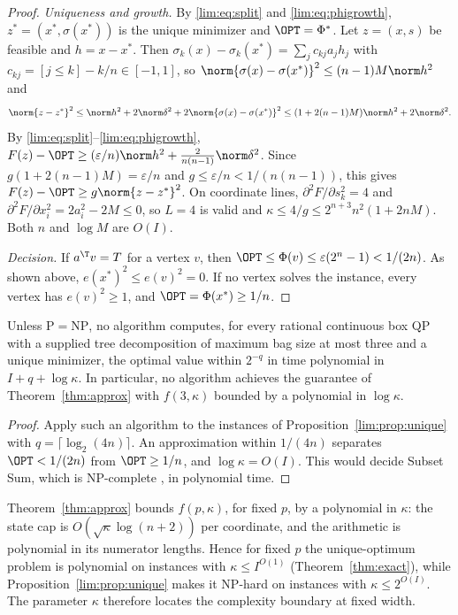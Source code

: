 \begin{proof}
\emph{Uniqueness and growth.} By \eqref{lim:eq:split} and
\eqref{lim:eq:phigrowth}, $z^*=(x^*,\sigma(x^*))$ is the unique minimizer
and $\OPT=\Phi^*$. Let $z=(x,s)$ be feasible and $h=x-x^*$. Then
$\sigma_k(x)-\sigma_k(x^*)=\sum_jc_{kj}a_jh_j$ with
$c_{kj}=[j\le k]-k/n\in[-1,1]$, so
$\norm{\sigma(x)-\sigma(x^*)}^2\le(n-1)M\norm h^2$ and
\[
\norm{z-z^*}^2\le\norm h^2+2\norm\delta^2+2\norm{\sigma(x)-\sigma(x^*)}^2
\le(1+2(n-1)M)\norm h^2+2\norm\delta^2 .
\]
By \eqref{lim:eq:split}--\eqref{lim:eq:phigrowth},
$F(z)-\OPT\ge(\varepsilon/n)\norm h^2+\frac2{n(n-1)}\norm\delta^2$. Since
$g(1+2(n-1)M)=\varepsilon/n$ and $g\le\varepsilon/n<1/(n(n-1))$, this gives
$F(z)-\OPT\ge g\norm{z-z^*}^2$. On coordinate lines,
$\partial^2F/\partial s_k^2=4$ and $\partial^2F/\partial x_i^2=2a_i^2-2M\le0$,
so $L=4$ is valid and $\kappa\le4/g\le2^{n+3}n^2(1+2nM)$. Both $n$ and
$\log M$ are $O(I)$.

\emph{Decision.} If $a^{\T}v=T$ for a vertex $v$, then
$\OPT\le\Phi(v)\le\varepsilon(2^n-1)<1/(2n)$. As shown above,
$e(x^*)^2\le e(v)^2=0$. If no vertex solves the instance, every vertex has
$e(v)^2\ge1$, and $\OPT=\Phi(x^*)\ge1/n$.
\end{proof}

\begin{corollary}
\label{lim:cor:nopolylog}
Unless $\mathrm P=\mathrm{NP}$, no algorithm computes, for every rational
continuous box QP with a supplied tree decomposition of maximum bag size at
most three and a unique minimizer, the optimal value within $2^{-q}$ in time
polynomial in $I+q+\log\kappa$. In particular, no algorithm achieves the
guarantee of Theorem~\ref{thm:approx} with $f(3,\kappa)$ bounded by a
polynomial in $\log\kappa$.
\end{corollary}

\begin{proof}
Apply such an algorithm to the instances of
Proposition~\ref{lim:prop:unique} with $q=\lceil\log_2(4n)\rceil$. An
approximation within $1/(4n)$ separates $\OPT<1/(2n)$ from $\OPT\ge1/n$,
and $\log\kappa=O(I)$. This would decide Subset Sum, which is NP-complete
\cite{GareyJohnson1979}, in polynomial time.
\end{proof}

Theorem~\ref{thm:approx} bounds $f(p,\kappa)$, for fixed $p$, by a
polynomial in $\kappa$: the state cap is $O(\sqrt\kappa\log(n+2))$ per
coordinate, and the arithmetic is polynomial in its numerator lengths.
Hence for fixed $p$ the unique-optimum problem is polynomial on instances
with $\kappa\le I^{O(1)}$ (Theorem~\ref{thm:exact}), while
Proposition~\ref{lim:prop:unique} makes it NP-hard on instances with
$\kappa\le2^{O(I)}$. The parameter $\kappa$ therefore locates the
complexity boundary at fixed width.


